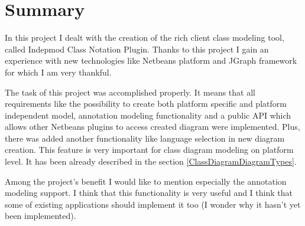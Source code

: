 \section{Summary}

In this project I dealt with the creation of the rich client class modeling tool, called Indepmod Class Notation Plugin. Thanks to this project I gain an experience with new technologies like Netbeans platform and JGraph framework for which I am very thankful. 

The task of this project was accomplished properly. It means that all requirements like the possibility to create both platform specific and platform independent model, annotation modeling functionality and a public API which allows other Netbeans plugins to access created diagram were implemented. Plus, there was added another functionality like language selection in new diagram creation. This feature is very important for class diagram modeling on platform level. It has been already described in the section \ref{ClassDiagramDiagramTypes}.

Among the project's benefit I would like to mention especially the annotation modeling support. I think that this functionality is very useful and I think that some of existing applications should implement it too (I wonder why it hasn't yet been implemented).

